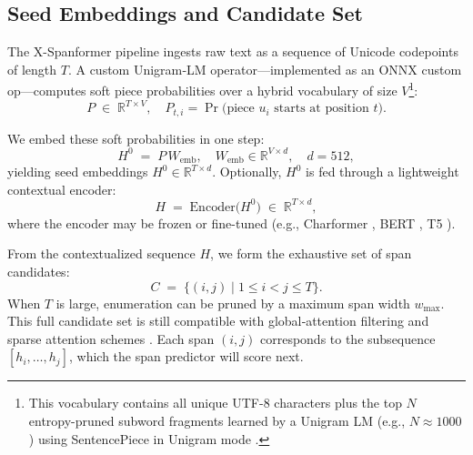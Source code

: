 \subsection{Seed Embeddings and Candidate Set}

The X-Spanformer pipeline ingests raw text as a sequence of Unicode codepoints of length \(T\). A custom Unigram‐LM operator—implemented as an ONNX custom op—computes soft piece probabilities over a hybrid vocabulary of size \(V\)\footnote{\label{fn:unigram}This vocabulary contains all unique UTF-8 characters plus the top \(N\) entropy-pruned subword fragments learned by a Unigram LM (e.g., \(N\approx1000\)) using SentencePiece in Unigram mode \cite{kudo2018sentencepiece,rawson2025streammix}.}:  
\[
P \;\in\;\mathbb{R}^{T\times V}, 
\quad 
P_{t,i} = \Pr\bigl(\text{piece }u_i\text{ starts at position }t\bigr).
\]

We embed these soft probabilities in one step:  
\[
H^0 \;=\; P\,W_{\text{emb}},
\quad
W_{\text{emb}}\in\mathbb{R}^{V\times d},\quad d=512,
\]
yielding seed embeddings \(H^0\in\mathbb{R}^{T\times d}\). Optionally, \(H^0\) is fed through a lightweight contextual encoder:
\[
H \;=\;\mathrm{Encoder}\bigl(H^0\bigr)\;\in\;\mathbb{R}^{T\times d},
\]
where the encoder may be frozen or fine-tuned (e.g., Charformer \cite{tay2021charformer}, BERT \cite{devlin2019bert}, T5 \cite{raffel2020t5}).

From the contextualized sequence \(H\), we form the exhaustive set of span candidates:
\[
C \;=\;\{(i,j)\mid 1 \le i < j \le T\}.
\]
When \(T\) is large, enumeration can be pruned by a maximum span width \(w_{\max}\). This full candidate set is still compatible with global‐attention filtering and sparse attention schemes \cite{joshi2020spanbert,tay2021charformer}. Each span \((i,j)\) corresponds to the subsequence \([h_i,\dots,h_j]\), which the span predictor will score next.

